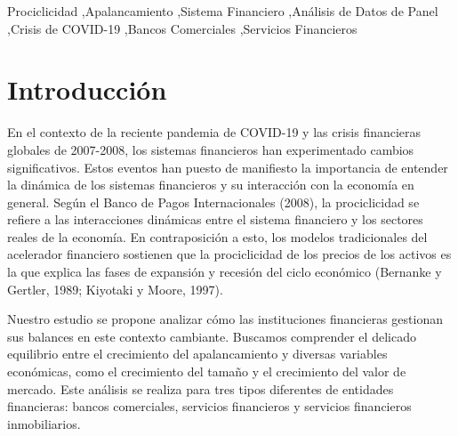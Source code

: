 \documentclass[a4paper,fleqn]{cas-sc}
\begin{document}


\begin{keywords}
    Prociclicidad \sep Apalancamiento \sep Sistema Financiero \sep Análisis de Datos de Panel \sep Crisis de COVID-19 \sep Bancos Comerciales \sep Servicios Financieros 
\end{keywords}

\maketitle


\section{Introducción}
En el contexto de la reciente pandemia de COVID-19 y las crisis financieras globales de 2007-2008, los sistemas financieros han experimentado cambios significativos. Estos eventos han puesto de manifiesto la importancia de entender la dinámica de los sistemas financieros y su interacción con la economía en general. Según el Banco de Pagos Internacionales (2008), la prociclicidad se refiere a las interacciones dinámicas entre el sistema financiero y los sectores reales de la economía. En contraposición a esto, los modelos tradicionales del acelerador financiero sostienen que la prociclicidad de los precios de los activos es la que explica las fases de expansión y recesión del ciclo económico (Bernanke y Gertler, 1989; Kiyotaki y Moore, 1997).

Nuestro estudio se propone analizar cómo las instituciones financieras gestionan sus balances en este contexto cambiante. Buscamos comprender el delicado equilibrio entre el crecimiento del apalancamiento y diversas variables económicas, como el crecimiento del tamaño y el crecimiento del valor de mercado. Este análisis se realiza para tres tipos diferentes de entidades financieras: bancos comerciales, servicios financieros y servicios financieros inmobiliarios.
\end{document}
